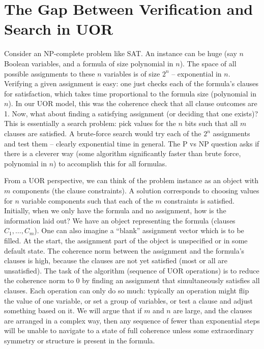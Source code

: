 \documentclass[11pt]{article}
\begin{document}
\section{The Gap Between Verification and Search in UOR}
Consider an NP-complete problem like SAT. An instance can be huge (say \(n\) Boolean variables, and a formula of size polynomial in \(n\)). The space of all possible assignments to these \(n\) variables is of size \(2^n\) -- exponential in \(n\). Verifying a given assignment is easy: one just checks each of the formula’s clauses for satisfaction, which takes time proportional to the formula size (polynomial in \(n\)). In our UOR model, this was the coherence check that all clause outcomes are 1. Now, what about finding a satisfying assignment (or deciding that one exists)? This is essentially a search problem: pick values for the \(n\) bits such that all \(m\) clauses are satisfied. A brute-force search would try each of the \(2^n\) assignments and test them -- clearly exponential time in general. The P vs NP question asks if there is a cleverer way (some algorithm significantly faster than brute force, polynomial in \(n\)) to accomplish this for all formulas.

From a UOR perspective, we can think of the problem instance as an object with \(m\) components (the clause constraints). A solution corresponds to choosing values for \(n\) variable components such that each of the \(m\) constraints is satisfied. Initially, when we only have the formula and no assignment, how is the information laid out? We have an object representing the formula (clauses \(C_1,\ldots,C_m\)). One can also imagine a “blank” assignment vector which is to be filled. At the start, the assignment part of the object is unspecified or in some default state. The coherence norm between the assignment and the formula’s clauses is high, because the clauses are not yet satisfied (most or all are unsatisfied). The task of the algorithm (sequence of UOR operations) is to reduce the coherence norm to 0 by finding an assignment that simultaneously satisfies all clauses. Each operation can only do so much: typically an operation might flip the value of one variable, or set a group of variables, or test a clause and adjust something based on it. We will argue that if \(m\) and \(n\) are large, and the clauses are arranged in a complex way, then any sequence of fewer than exponential steps will be unable to navigate to a state of full coherence unless some extraordinary symmetry or structure is present in the formula.
\end{document}
